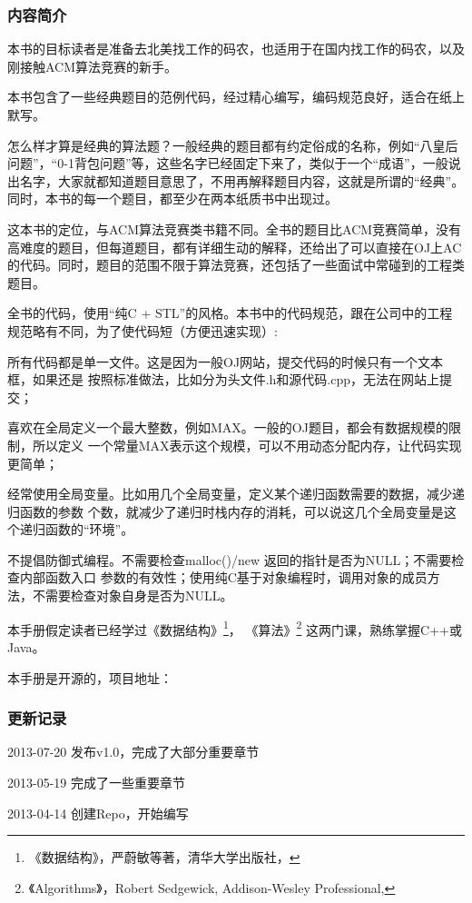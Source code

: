 \subsubsection{内容简介}
本书的目标读者是准备去北美找工作的码农，也适用于在国内找工作的码农，以及刚接触ACM算法竞赛的新手。

本书包含了一些经典题目的范例代码，经过精心编写，编码规范良好，适合在纸上默写。

怎么样才算是经典的算法题？一般经典的题目都有约定俗成的名称，例如“八皇后问题”，“0-1背包问题”等，这些名字已经固定下来了，类似于一个“成语”，一般说出名字，大家就都知道题目意思了，不用再解释题目内容，这就是所谓的“经典”。同时，本书的每一个题目，都至少在两本纸质书中出现过。

这本书的定位，与ACM算法竞赛类书籍不同。全书的题目比ACM竞赛简单，没有高难度的题目，但每道题目，都有详细生动的解释，还给出了可以直接在OJ上AC的代码。同时，题目的范围不限于算法竞赛，还包括了一些面试中常碰到的工程类题目。

全书的代码，使用“纯C + STL”的风格。本书中的代码规范，跟在公司中的工程规范略有不同，为了使代码短（方便迅速实现）:

\begindot
\item 所有代码都是单一文件。这是因为一般OJ网站，提交代码的时候只有一个文本框，如果还是
按照标准做法，比如分为头文件.h和源代码.cpp，无法在网站上提交；

\item 喜欢在全局定义一个最大整数，例如MAX。一般的OJ题目，都会有数据规模的限制，所以定义
一个常量MAX表示这个规模，可以不用动态分配内存，让代码实现更简单；

\item 经常使用全局变量。比如用几个全局变量，定义某个递归函数需要的数据，减少递归函数的参数
个数，就减少了递归时栈内存的消耗，可以说这几个全局变量是这个递归函数的“环境”。

\item 不提倡防御式编程。不需要检查malloc()/new 返回的指针是否为NULL；不需要检查内部函数入口
参数的有效性；使用纯C基于对象编程时，调用对象的成员方法，不需要检查对象自身是否为NULL。
\myenddot

本手册假定读者已经学过《数据结构》\footnote{《数据结构》，严蔚敏等著，清华大学出版社，
}，
《算法》\footnote{《Algorithms》，Robert Sedgewick, Addison-Wesley Professional, }
这两门课，熟练掌握C++或Java。

本手册是开源的，项目地址：


\subsubsection{更新记录}
\begindot
\item[] 2013-07-20 发布v1.0，完成了大部分重要章节
\item[] 2013-05-19 完成了一些重要章节
\item[] 2013-04-14 创建Repo，开始编写
\myenddot
